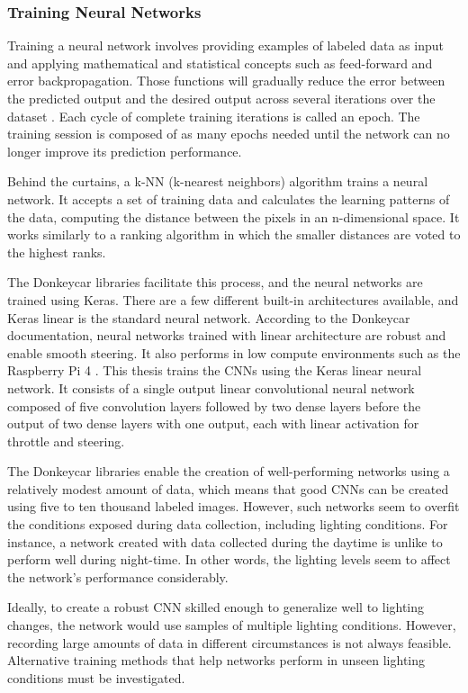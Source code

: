 \documentclass[12pt]{article}
\begin{document}
\subsubsection{Training Neural Networks}

Training a neural network involves providing examples of labeled data as input and applying mathematical and statistical concepts such as feed-forward and error backpropagation. Those functions will gradually reduce the error between the predicted output and the desired output across several iterations over the dataset \parencite{chang2018}. Each cycle of complete training iterations is called an epoch. The training session is composed of as many epochs needed until the network can no longer improve its prediction performance. 

Behind the curtains, a k-NN (k-nearest neighbors) algorithm trains a neural network. It accepts a set of training data and calculates the learning patterns of the data, computing the distance between the pixels in an n-dimensional space. It works similarly to a ranking algorithm in which the smaller distances are voted to the highest ranks.

The Donkeycar libraries facilitate this process, and the neural networks are trained using Keras. There are a few different built-in architectures available, and Keras linear is the standard neural network. According to the Donkeycar documentation, neural networks trained with linear architecture are robust and enable smooth steering. It also performs in low compute environments such as the Raspberry Pi 4 \parencite{donkeykeras}. This thesis trains the CNNs using the Keras linear neural network. It consists of a single output linear convolutional neural network composed of five convolution layers followed by two dense layers before the output of two dense layers with one output, each with linear activation for throttle and steering. 

The Donkeycar libraries enable the creation of well-performing networks using a relatively modest amount of data, which means that good CNNs can be created using five to ten thousand labeled images. However, such networks seem to overfit the conditions exposed during data collection, including lighting conditions. For instance, a network created with data collected during the daytime is unlike to perform well during night-time. In other words, the lighting levels seem to affect the network's performance considerably. 

Ideally, to create a robust CNN skilled enough to generalize well to lighting changes, the network would use samples of multiple lighting conditions. However, recording large amounts of data in different circumstances is not always feasible. Alternative training methods that help networks perform in unseen lighting conditions must be investigated. 
\end{document}
